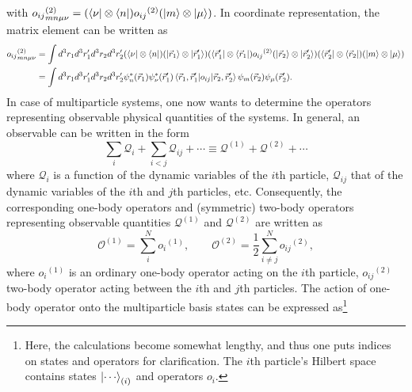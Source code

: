 \documentclass[a4paper,12pts]{article}
\numberwithin{equation}{section}
\begin{document}
	with ${o_{ij}}^{(2)}_{mn\mu\nu} = (\bra{\nu}\otimes\bra{n}){o_{ij}}^{(2)}(\ket{m}\otimes\ket{\mu})$. In coordinate representation, the matrix element can be written as
	\begin{align}
	{o_{ij}}^{(2)}_{mn\mu\nu} &= \int d^3r_1d^3r_1'd^3r_2d^3r_2' (\bra{\nu}\otimes\bra{n})(\ket{\vec{r}_1}\otimes\ket{\vec{r}_1'})(\bra{\vec{r}_1'}\otimes\bra{\vec{r}_1}){o_{ij}}^{(2)}(\ket{\vec{r}_2}\otimes\ket{\vec{r}_2'})(\bra{\vec{r}_2'}\otimes\bra{\vec{r}_2})(\ket{m}\otimes\ket{\mu}) \\
	&= \int d^3r_1d^3r_1'd^3r_2d^3r_2' \psi_n^*(\vec{r}_1)\psi_{\nu}^*(\vec{r}_1')\braket{\vec{r}_1,\vec{r}_1'|{o_{ij}}|\vec{r}_2,\vec{r}_2'}\psi_m(\vec{r}_2)\psi_{\mu}(\vec{r}_2').
	\end{align}
	In case of multiparticle systems, one now wants to determine the operators representing observable physical quantities of the systems. In general, an observable can be written in the form
	\begin{equation}
	\sum_{i}\mathcal{Q}_i + \sum_{i<j}\mathcal{Q}_{ij} + \cdots \equiv \mathcal{Q}^{(1)} + \mathcal{Q}^{(2)} + \cdots
	\end{equation}
	where $\mathcal{Q}_{i}$ is a function of the dynamic variables of the $i$th particle, $\mathcal{Q}_{ij}$ that of the dynamic variables of the $i$th and $j$th particles, etc. Consequently, the corresponding one-body operators and (symmetric) two-body operators representing observable quantities $\mathcal{Q}^{(1)}$ and $\mathcal{Q}^{(2)}$ are written as
	\begin{equation}
	\mathcal{O}^{(1)} = \sum_{i}^N{o_i}^{(1)},\qquad \mathcal{O}^{(2)} = \frac{1}{2}\sum_{i\neq j}^N{o_{ij}}^{(2)},
	\end{equation}
	where ${o_i}^{(1)}$ is an ordinary one-body operator acting on the $i$th particle, ${o_{ij}}^{(2)}$ two-body operator acting between the $i$th and $j$th particles. The action of one-body operator onto the multiparticle basis states can be expressed as\footnote{Here, the calculations become somewhat lengthy, and thus one puts indices on states and operators for clarification. The $i$th particle's Hilbert space contains states $\ket{\cdots}_{(i)}$ and operators $o_i$.}
\end{document}
